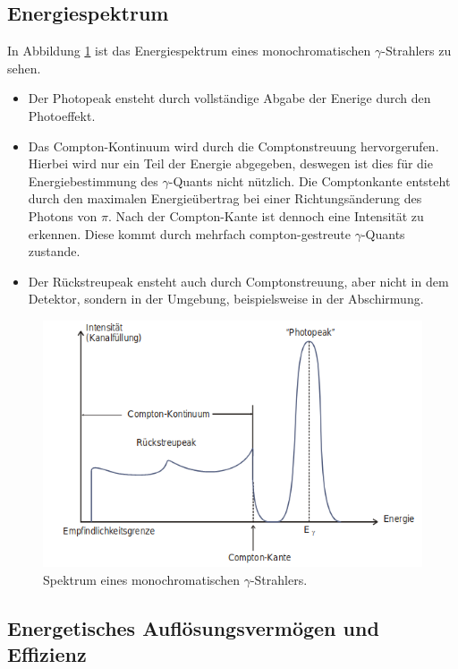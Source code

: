 \subsection{Energiespektrum}
In Abbildung \ref{abb:4} ist das Energiespektrum eines monochromatischen
$\gamma$-Strahlers zu sehen.
\begin{itemize}
  \item Der Photopeak ensteht durch vollständige Abgabe der Enerige
  durch den Photoeffekt.
  \item Das Compton-Kontinuum wird durch die Comptonstreuung hervorgerufen.
  Hierbei wird nur ein Teil der Energie abgegeben, deswegen ist dies für die
  Energiebestimmung des $\gamma$-Quants nicht nützlich. Die Comptonkante entsteht durch
  den maximalen Energieübertrag bei einer Richtungsänderung des Photons von $\pi$.
  Nach der Compton-Kante ist dennoch eine Intensität zu erkennen. Diese kommt
  durch mehrfach compton-gestreute $\gamma$-Quants zustande.
  \item Der Rückstreupeak ensteht auch durch Comptonstreuung, aber
  nicht in dem Detektor, sondern in der Umgebung, beispielsweise in der
  Abschirmung.
\end{itemize}

\begin{figure}
  \centering
  \includegraphics[scale=0.5]{Spektrum.png}
  \caption{Spektrum eines monochromatischen $\gamma$-Strahlers. \cite{Q1}}
  \label{abb:4}
\end{figure}

\subsection{Energetisches Auflösungsvermögen und Effizienz}


